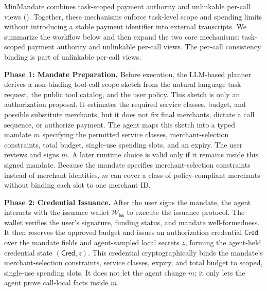 \documentclass[letterpaper]{article}
\newcommand{\system}{MinMandate\xspace}
\begin{document}
\system combines task-scoped payment authority and unlinkable per-call
views (). Together, these mechanisms enforce
task-level scope and spending limits without introducing a stable payment
identifier into external transcripts. We summarize the workflow below and then
expand the two core mechanisms: task-scoped payment authority and unlinkable
per-call views. The per-call consistency binding is part of unlinkable per-call
views.

\noindent\textbf{Phase 1: Mandate Preparation.}
Before execution, the LLM-based planner derives a non-binding tool-call scope
sketch from the natural language task request, the public tool catalog, and the
user policy. This sketch is only an authorization proposal. It estimates the
required service classes, budget, and possible substitute merchants, but it does
not fix final merchants, dictate a call sequence, or authorize payment.
The agent maps this sketch into a typed mandate \(m\) specifying the permitted
service classes, merchant-selection constraints, total budget, single-use
spending slots, and an expiry. The user reviews and signs \(m\). A later runtime
choice is valid only if it remains inside this signed mandate. Because the
mandate specifies merchant-selection constraints instead of merchant identities, \(m\)
can cover a class of policy-compliant merchants without binding each slot to
one merchant ID.

\noindent\textbf{Phase 2: Credential Issuance.}
After the user signs the mandate, the agent interacts with the issuance wallet
\(\mathcal{W}_{\mathsf{iss}}\) to execute the issuance protocol.
The wallet verifies the user's signature, funding status, and mandate
well-formedness. It then reserves the approved budget and issues an
authorization credential \(\mathsf{Cred}\) over the mandate fields and
agent-sampled local secrets \(z\), forming the agent-held credential state
\((\mathsf{Cred},z)\). This credential
cryptographically binds the mandate's merchant-selection constraints, service
classes, expiry, and total budget to scoped, single-use spending slots. It does
not let the agent change \(m\); it only lets the agent prove call-local facts
inside \(m\).
\end{document}
